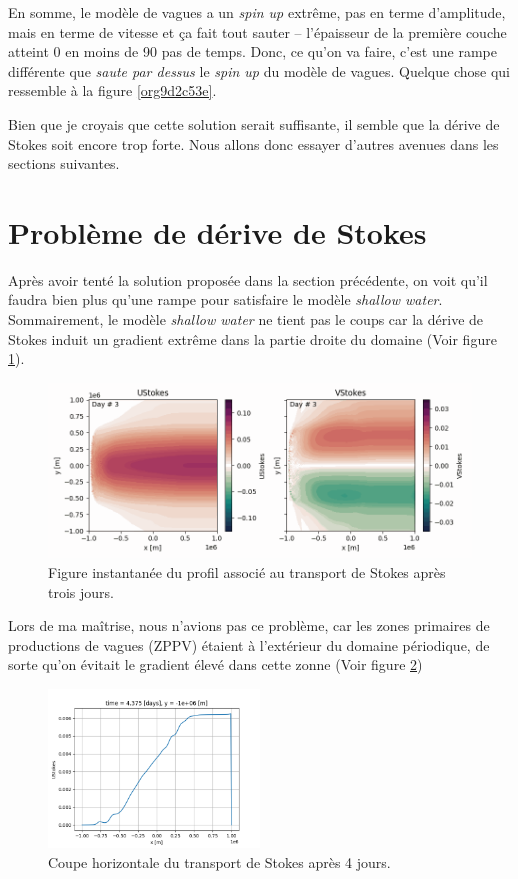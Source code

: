 \documentclass[10pt]{report}
\numberwithin{equation}{section}
\begin{document}
En somme, le modèle de vagues a un \emph{spin up} extrême, pas en terme d'amplitude, mais en terme de vitesse et ça fait tout sauter -- l'épaisseur de la première couche atteint 0 en moins de 90 pas de temps.
Donc, ce qu'on va faire, c'est une rampe différente que \emph{saute par dessus} le \emph{spin up} du modèle de vagues.
Quelque chose qui ressemble à la figure \ref{org9d2c53e}. \bigskip

Bien que je croyais que cette solution serait suffisante, il semble que la dérive de Stokes soit encore trop forte.
Nous allons donc essayer d'autres avenues dans les sections suivantes. 

\section{Problème de dérive de Stokes}
\label{sec:org84f51ee}
Après avoir tenté la solution proposée dans la section précédente, on voit qu'il faudra bien plus qu'une rampe pour satisfaire le modèle \emph{shallow water}.
Sommairement, le modèle \emph{shallow water} ne tient pas le coups car la dérive de Stokes induit un gradient extrême dans la partie droite du domaine (Voir figure \ref{fig:org0596a03}).

\begin{figure}[htbp]
\centering
\includegraphics[width=.9\linewidth]{figures/debuggage/2023_10_13_UStokes.png}
\caption{\label{fig:org0596a03}Figure instantanée du profil associé au transport de Stokes après trois jours.}
\end{figure}

Lors de ma maîtrise, nous n'avions pas ce problème, car les zones primaires de productions de vagues (ZPPV) étaient à l'extérieur du domaine périodique, de sorte qu'on évitait le gradient élevé dans cette zonne (Voir figure \ref{fig:org4ca5f2f})

\begin{figure}[!htpb]
\centering
\includegraphics[width=0.5\textwidth]{figures/debuggage/2023_10_13_Stokes_coupe.png}
\caption{\label{fig:org4ca5f2f}Coupe horizontale du transport de Stokes après 4 jours.}
\end{figure}
\end{document}
